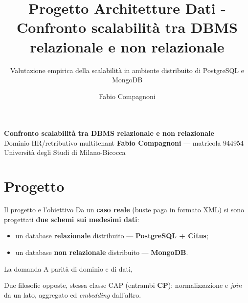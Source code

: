 \documentclass[aspectratio=169,11pt]{beamer}
\title{Progetto Architetture Dati - Confronto scalabilità tra DBMS relazionale e non relazionale}
\subtitle{Valutazione empirica della scalabilità in ambiente distribuito di PostgreSQL e MongoDB}
\author{Fabio Compagnoni}
\begin{document}
{
\begin{frame}[plain]
  \vspace{3.9cm}\par
  {\large\color{ink}\bfseries Confronto scalabilità tra DBMS relazionale e non relazionale}\\[0.2em]
  {\color{grigio}Dominio HR/retributivo multitenant}
  \vfill
  {\color{ink}\textbf{Fabio Compagnoni} — matricola 944954}\\[0.15em]
  {\footnotesize\color{grigio}Università degli Studi di Milano-Bicocca}
\end{frame}}

\section{Progetto}
\begin{frame}{Il progetto e l'obiettivo}
  Da un \textbf{caso reale} (buste paga in formato XML) si sono progettati \textbf{due schemi sui medesimi dati}:
  \begin{itemize}
    \item un database \textbf{relazionale} distribuito — \textbf{PostgreSQL + Citus};
    \item un database \textbf{non relazionale} distribuito — \textbf{MongoDB}.
  \end{itemize}
  \vspace{0.3em}
  \begin{keyblock}{La domanda}
    A parità di dominio e di dati, 
  \end{keyblock}
  \vspace{0.2em}
  Due filosofie opposte, stessa classe CAP (entrambi \textbf{CP}): normalizzazione e \emph{join} da un lato,
  aggregato ed \emph{embedding} dall'altro.
\end{frame}
\end{document}
